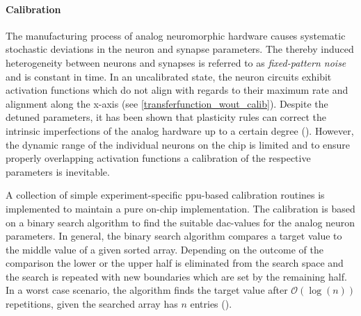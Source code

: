 
%
%
\paragraph{Calibration}\label{calibration}
The manufacturing process of analog neuromorphic hardware causes systematic stochastic deviations in the neuron and synapse parameters. The thereby induced heterogeneity between neurons and synapses is referred to as \emph{fixed-pattern noise} and is constant in time. In an uncalibrated state, the neuron circuits exhibit activation functions which do not align with regards to their maximum rate and alignment along the x-axis (see \cref{transferfunction_wout_calib}). Despite the detuned parameters, it has been shown that plasticity rules can correct the intrinsic imperfections of the analog hardware up to a certain degree (\citealp{wunderlich2019advantages}). However, the dynamic range of the individual neurons on the chip is limited and to ensure properly overlapping activation functions a calibration of the respective parameters is inevitable.

A collection of simple experiment-specific \gls{ppu}-based calibration routines is implemented to maintain a pure on-chip implementation. The calibration is based on a binary search algorithm to find the suitable \gls{dac}-values for the analog neuron parameters. In general, the binary search algorithm compares a target value to the middle value of a given sorted array. Depending on the outcome of the comparison the lower or the upper half is eliminated from the search space and the search is repeated with new boundaries which are set by the remaining half. In a worst case scenario, the algorithm finds the target value after $\mathcal{O}(\log(n))$ repetitions, given the searched array has $n$ entries  (\citealp{binarysearchsource}).

